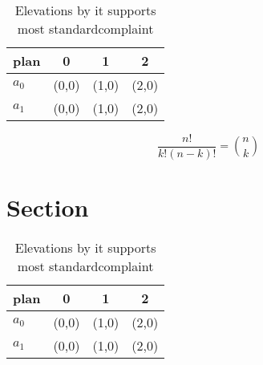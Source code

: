 \documentclass[a4paper]{article}
\begin{document}
\begin{table}
\begin{adjustbox}{width=0.6\columnwidth}
\begin{tabular}{|l|l|l|l|}
\hline
\textbf{plan} & \multicolumn{1}{c|}{\textbf{0}} & \multicolumn{1}{c|}{\textbf{1}} & \multicolumn{1}{c|}{\textbf{2}} \\ \hline
\textbf{$a_0$}  & (0,0) & (1,0) & (2,0) \\ \hline
\textbf{$a_1$}  & (0,0) & (1,0) & (2,0) \\ \hline
\end{tabular}
\end{adjustbox}
\caption{Elevations by it supports most standardcomplaint 
}
\end{table}

\[ \frac{n!}{k!(n-k)!} = \binom{n}{k} \]

\section{Section}

\begin{table}
\begin{adjustbox}{width=0.6\columnwidth}
\begin{tabular}{|l|l|l|l|}
\hline
\textbf{plan} & \multicolumn{1}{c|}{\textbf{0}} & \multicolumn{1}{c|}{\textbf{1}} & \multicolumn{1}{c|}{\textbf{2}} \\ \hline
\textbf{$a_0$}  & (0,0) & (1,0) & (2,0) \\ \hline
\textbf{$a_1$}  & (0,0) & (1,0) & (2,0) \\ \hline
\end{tabular}
\end{adjustbox}
\caption{Elevations by it supports most standardcomplaint 
}
\end{table}
\end{document}
